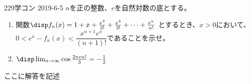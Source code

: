 \begin{prob}{229}{}{学コン 2019-6-5}
 $n$を正の整数、$e$を自然対数の底とする。
 \begin{enumerate}
  \item 関数$\disp f_n(x)=1+x+\frac{x^2}{2!}+\frac{x^3}{3!}+\dots +\frac{x^n}{n!}$ とするとき、$x>0$において、$0<e^x-f_n(x)<\dfrac{x^{n+1}e^x}{(n+1)!}$であることを示せ。
  \item $\disp \lim_{n\to\infty} \cos\frac{2\pi e n!}{3}=-\frac{1}{2}$
 \end{enumerate}
\end{prob}
ここに解答を記述